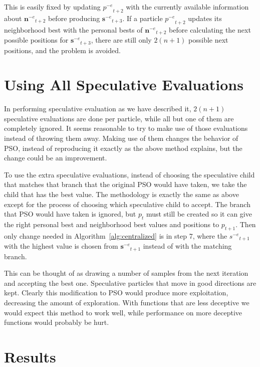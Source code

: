 \documentclass[conference,letterpaper]{IEEEtran}
\newcommand{\alg}[1]{Algorithm~\ref{alg:#1}}
\providecommand{\noeval}[1]{\ensuremath{#1^{-e}}}
\providecommand{\p}{\ensuremath{p}}
\providecommand{\s}{\ensuremath{s}}
\providecommand{\sset}{\ensuremath{\mathbf{s}}}
\providecommand{\nset}{\ensuremath{\mathbf{n}}}
\begin{document}
This is easily fixed by updating $\noeval{\p}_{t+2}$ with the currently
available information about $\noeval{\nset}_{t+2}$ before producing
$\noeval{\sset}_{t+3}$.  If a particle $\noeval{\p}_{t+2}$ updates its 
neighborhood best with the personal bests of $\noeval{\nset}_{t+2}$ before
calculating the next possible positions for $\noeval{\sset}_{t+3}$, there are
still only $2(n+1)$ possible next positions, and the problem is avoided.

\section{Using All Speculative Evaluations}
\label{sec:extra}

In performing speculative evaluation as we have described it, $2(n+1)$
speculative evaluations are done per particle, while all but one of them are
completely ignored.  It seems reasonable to try to make use of those
evaluations instead of throwing them away.  Making use of them changes the
behavior of PSO, instead of reproducing it exactly as the above method
explains, but the change could be an improvement.

To use the extra speculative evaluations, instead of choosing the speculative
child that matches that branch that the original PSO would have taken, we take
the child that has the best value.  The methodology is exactly the same as
above except for the process of choosing which speculative child to accept.
The branch that PSO would have taken is ignored, but $\p_t$ must still be
created so it can give the right personal best and neighborhood best values and
positions to $\p_{t+1}$.  Then only change needed in \alg{centralized} is in
step 7, where the $\noeval{\s}_{t+1}$ with the highest value is chosen from
$\noeval{\sset}_{t+1}$ instead of with the matching branch.

This can be thought of as drawing a number of samples from the next iteration
and accepting the best one.  Speculative particles that move in good directions
are kept.  Clearly this modification to PSO would produce more exploitation,
decreasing the amount of exploration.  With functions that are less deceptive
we would expect this method to work well, while performance on more deceptive
functions would probably be hurt.

\section{Results}
\label{sec:results}
\end{document}

